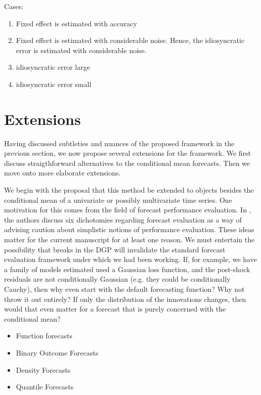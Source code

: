 \documentclass{uiucthesis2021}
\theoremstyle{definition}
\begin{document}
  Cases:
  \begin{enumerate}
    \item Fixed effect is estimated with accuracy 
    \item Fixed effect is estimated with considerable noise.  Hence, the idiosyncratic error is estimated with considerable noise.
    \item idiosyncratic error large
    \item idiosyncratic error small
  \end{enumerate}  
  
  \section{Extensions}\label{Extensions}

  Having discussed subtleties and nuances of the proposed framework in the previous section, we now propose several extensions for the framework.  We first discuss straigthforward alternatives to the conditional mean forecasts.  Then we move onto more elaborate extensions.

  We begin with the proposal that this method be extended to objects besides the conditional mean of a univariate or possibly multivariate time series.  One motivation for this comes from the field of forecast performance evaluation.  In \cite[][]{clements2005evaluating}, the authors discuss six dichotomies regarding forecast evaluation as a way of advising caution about simplistic notions of performance evaluation.  These ideas matter for the current manuscript for at least one reason.  We must entertain the possibility that breaks in the DGP will invalidate the standard forecast evaluation framework under which we had been working.  If, for example, we have a family of models estimated used a Gaussian loss function, and the post-shock residuals are not conditionally Gaussian (e.g. they could be conditionally Cauchy), then why even start with the default forecasting function?  Why not throw it out entirely?  If only the distribution of the innovations changes, then would that even matter for a forecast that is purely concerned with the conditional mean?

  \begin{itemize}
    \item Function forecasts
    \item Binary Outcome Forecasts
    \item Density Forecasts
    \item Quantile Forecasts
  \end{itemize}
\end{document}
